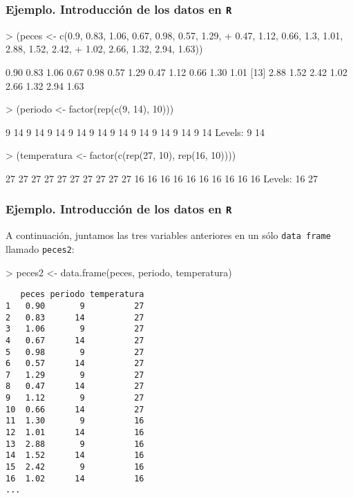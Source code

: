 \begin{frame}[fragile]
\frametitle{Ejemplo. Introducción de los datos en {\tt R}}

{\small
\begin{Schunk}
\begin{Sinput}
> (peces <- c(0.9, 0.83, 1.06, 0.67, 0.98, 0.57, 1.29, 
+     0.47, 1.12, 0.66, 1.3, 1.01, 2.88, 1.52, 2.42, 
+     1.02, 2.66, 1.32, 2.94, 1.63))
\end{Sinput}
\begin{Soutput}
 [1] 0.90 0.83 1.06 0.67 0.98 0.57 1.29 0.47 1.12 0.66 1.30 1.01
[13] 2.88 1.52 2.42 1.02 2.66 1.32 2.94 1.63
\end{Soutput}
\begin{Sinput}
> (periodo <- factor(rep(c(9, 14), 10)))
\end{Sinput}
\begin{Soutput}
 [1] 9  14 9  14 9  14 9  14 9  14 9  14 9  14 9  14 9  14 9  14
Levels: 9 14
\end{Soutput}
\begin{Sinput}
> (temperatura <- factor(c(rep(27, 10), rep(16, 10))))
\end{Sinput}
\begin{Soutput}
 [1] 27 27 27 27 27 27 27 27 27 27 16 16 16 16 16 16 16 16 16 16
Levels: 16 27
\end{Soutput}
\end{Schunk}
}

\end{frame}
\begin{frame}[fragile]
\frametitle{Ejemplo. Introducción de los datos en {\tt R}}
{\small 
A continuación, juntamos las tres variables anteriores en un sólo {\tt data frame} llamado {\tt peces2}:
{\footnotesize
\begin{Schunk}
\begin{Sinput}
> peces2 <- data.frame(peces, periodo, temperatura)
\end{Sinput}
\end{Schunk}

\begin{verbatim}
   peces periodo temperatura
1   0.90       9          27
2   0.83      14          27
3   1.06       9          27
4   0.67      14          27
5   0.98       9          27
6   0.57      14          27
7   1.29       9          27
8   0.47      14          27
9   1.12       9          27
10  0.66      14          27
11  1.30       9          16
12  1.01      14          16
13  2.88       9          16
14  1.52      14          16
15  2.42       9          16
16  1.02      14          16
...
\end{verbatim}}}
\end{frame}
